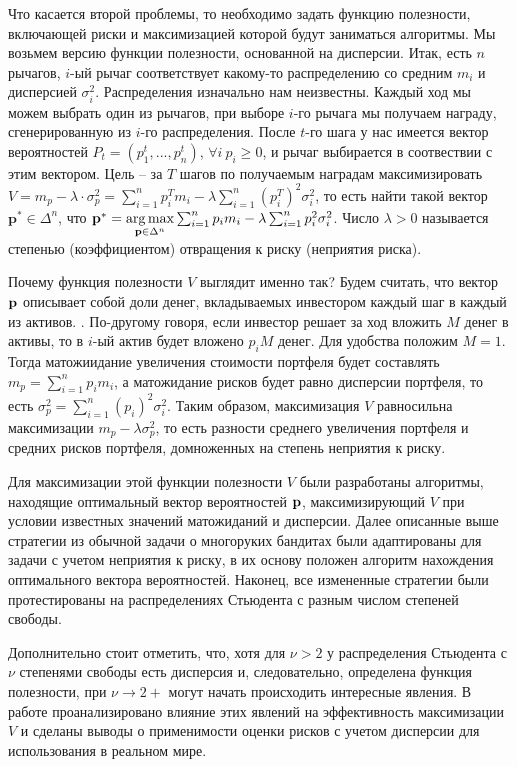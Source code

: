 Что касается второй проблемы, то необходимо задать функцию полезности, включающей риски и максимизацией которой будут заниматься алгоритмы. Мы возьмем версию функции полезности, основанной на дисперсии. Итак, есть $n$ рычагов, $i$-ый рычаг соответствует какому-то распределению со средним $m_i$ и дисперсией $\sigma_i^2$. Распределения изначально нам неизвестны. Каждый ход мы можем выбрать один из рычагов, при выборе $i$-го рычага мы получаем награду, сгенерированную из $i$-го распределения. После $t$-го шага у нас имеется вектор вероятностей $P_t = (p_1^t, ..., p_n^t)$, $\forall i \: p_i \geq 0$, и рычаг выбирается в соотвествии с этим вектором. Цель -- за $T$ шагов по получаемым наградам максимизировать $V = m_p - \lambda \cdot \sigma_p^2 = \sum_{i=1}^n p_i^T m_i - \lambda \sum_{i=1}^n (p_i^T)^2 \sigma_i^2$, то есть найти такой вектор $\textbf{p}^* \in \Delta^n$, что $\textbf{p}^* = \underset{\textbf{p} \in \Delta^n}{\arg \max} \sum_{i=1}^n p_i m_i - \lambda \sum_{i=1}^n p_i^2 \sigma_i^2$. Число $\lambda > 0$ называется степенью (коэффициентом) отвращения к риску (неприятия риска).

Почему функция полезности $V$ выглядит именно так? Будем считать, что вектор $\textbf{p}$ описывает собой доли денег, вкладываемых инвестором каждый шаг в каждый из активов. \cite{bouchaudpotters}. По-другому говоря, если инвестор решает за ход вложить $M$ денег в активы, то в $i$-ый актив будет вложено $p_i M$ денег. Для удобства положим $M=1$. Тогда матожиидание увеличения стоимости портфеля будет составлять $m_p = \sum_{i=1}^n p_i m_i$, а матожидание рисков будет равно дисперсии портфеля, то есть $\sigma_p^2 = \sum_{i=1}^n (p_i)^2 \sigma_i^2$. Таким образом, максимизация $V$ равносильна максимизации $m_p - \lambda \sigma_p^2$, то есть разности среднего увеличения портфеля и средних рисков портфеля, домноженных на степень неприятия к риску.

Для максимизации этой функции полезности $V$ были разработаны алгоритмы, находящие оптимальный вектор вероятностей $\textbf{p}$, максимизирующий $V$ при условии известных значений матожиданий и дисперсии. Далее описанные выше стратегии из обычной задачи о многоруких бандитах были адаптированы для задачи с учетом неприятия к риску, в их основу положен алгоритм нахождения оптимального вектора вероятностей. Наконец, все измененные стратегии были протестированы на распределениях Стьюдента с разным числом степеней свободы.

Дополнительно стоит отметить, что, хотя для $\nu > 2$ у распределения Стьюдента с $\nu$ степенями свободы есть дисперсия и, следовательно, определена функция полезности, при $\nu \to 2+$ могут начать происходить интересные явления. В работе проанализировано влияние этих явлений на эффективность максимизации $V$ и сделаны выводы о применимости оценки рисков с учетом дисперсии для использования в реальном мире.


